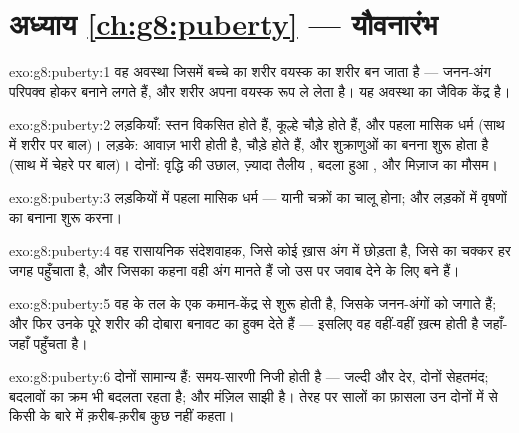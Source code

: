 \section*{अध्याय \ref{ch:g8:puberty} --- यौवनारंभ}

\begin{solution}{exo:g8:puberty:1}
वह अवस्था जिसमें बच्चे का शरीर वयस्क का शरीर बन जाता है --- जनन-अंग
परिपक्व होकर  बनाने लगते हैं, और शरीर अपना वयस्क रूप ले लेता है।
यह  अवस्था का जैविक केंद्र है।
\end{solution}

\begin{solution}{exo:g8:puberty:2}
लड़कियाँ: स्तन विकसित होते हैं, कूल्हे चौड़े होते हैं, और पहला मासिक धर्म
(साथ में शरीर पर बाल)। लड़के: आवाज़ भारी होती है,  चौड़े होते हैं,
और शुक्राणुओं का बनना शुरू होता है (साथ में चेहरे पर बाल)। दोनों:
वृद्धि की उछाल, ज़्यादा तैलीय , बदला हुआ , और मिज़ाज का मौसम।
\end{solution}

\begin{solution}{exo:g8:puberty:3}
लड़कियों में पहला मासिक धर्म --- यानी चक्रों का चालू होना; और लड़कों में
वृषणों का  बनाना शुरू करना।
\end{solution}

\begin{solution}{exo:g8:puberty:4}
वह रासायनिक संदेशवाहक, जिसे कोई ख़ास अंग  में छोड़ता है, जिसे 
का चक्कर हर जगह पहुँचाता है, और जिसका कहना वही अंग मानते हैं जो उस पर
जवाब देने के लिए बने हैं।
\end{solution}

\begin{solution}{exo:g8:puberty:5}
वह  के तल के एक कमान-केंद्र से शुरू होती है, जिसके 
जनन-अंगों को जगाते हैं; और फिर उनके  पूरे शरीर की दोबारा बनावट
का हुक्म देते हैं --- इसलिए वह वहीं-वहीं ख़त्म होती है जहाँ-जहाँ 
पहुँचता है।
\end{solution}

\begin{solution}{exo:g8:puberty:6}
दोनों सामान्य हैं: समय-सारणी निजी होती है --- जल्दी और देर, दोनों
सेहतमंद; बदलावों का क्रम भी बदलता रहता है; और मंज़िल साझी है। तेरह पर
सालों का फ़ासला उन दोनों में से किसी के बारे में क़रीब-क़रीब कुछ नहीं
कहता।
\end{solution}

